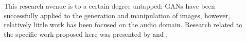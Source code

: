 This research avenue is to a certain degree untapped: GANs have been successfully applied to the generation and manipulation of images, however, relatively little work has been focused on the audio domain. Research related to the specific work proposed here was presented by \cite{donahue2018adversarial}  and \cite{engel2018gansynth}.

